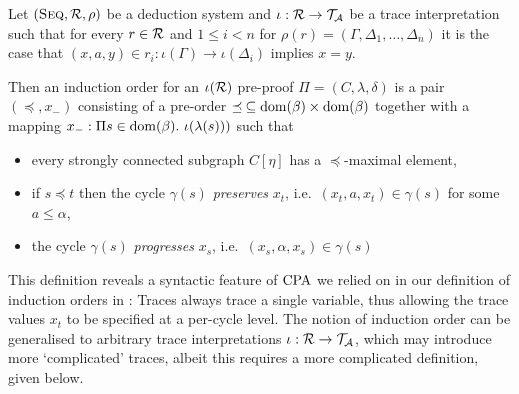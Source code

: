 \begin{definition}\label{def:io-abstract-a}
  Let $(\textsc{Seq}, \mathcal{R}, \rho)$ be a deduction system and $\iota : \mathcal{R} \to \mathcal{T}_{\mathcal{A}}$ be
  a trace interpretation such that for every $r \in \mathcal{R}$ and $1 \leq i < n$ for
  $\rho(r) = (\Gamma, \Delta_1, \ldots, \Delta_n)$ it is the case that $(x, a,
  y) \in r_i : \iota(\Gamma) \to \iota(\Delta_i)$ implies $x = y$.

  Then an induction order for an $\iota(\mathcal{R})$ pre-proof $\Pi = (C, \lambda, \delta)$ is
  a pair $(\preceq, x_{-})$ consisting of a
  pre-order
  $\mathrel{\preceq}\: \subseteq
  \mathrm{dom}(\beta) \times \mathrm{dom} (\beta) $ together with a mapping $x_{-} : \Pi s \in \mathrm{dom}(\beta).~\iota(\lambda(s)))$
  such that
  \begin{itemize}
  \item every strongly connected subgraph $C[\eta]$ has a
    $\preceq$-maximal element,
  \item if $s \preceq t$ then the cycle $\gamma(s)$ \emph{preserves} $x_t$, i.e.\ $(x_t,
    a, x_t) \in \gamma(s)$ for some $a \leq \alpha$,
  \item the cycle $\gamma(s)$ \emph{progresses} $x_s$, i.e.\ $(x_s, \alpha, x_s) \in \gamma(s)$
  \end{itemize}
\end{definition}

This definition reveals a syntactic feature of $\mathrm{CPA}$ we relied on in our
definition of induction orders in : Traces always trace a single
variable, thus allowing the trace values $x_t$ to be specified at a per-cycle level.
The notion of induction order can be generalised to arbitrary trace
interpretations $\iota : \mathcal{R} \to \mathcal{T}_{\mathcal{A}}$, which may introduce more
`complicated' traces, albeit this requires a more complicated
definition, given below.

